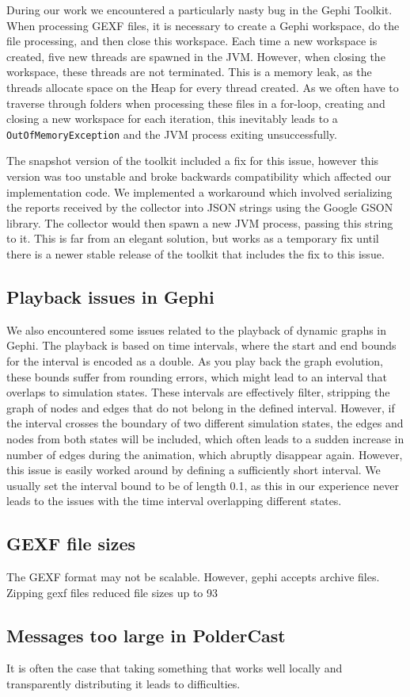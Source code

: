 During our work we encountered a particularly nasty bug in the Gephi
Toolkit. When processing GEXF files, it is necessary to create a Gephi
workspace, do the file processing, and then close this workspace. Each
time a new workspace is created, five new threads are spawned in the
JVM\@. However, when closing the workspace, these threads are not
terminated. This is a memory leak, as the threads allocate space on the
Heap for every thread created. As we often have to traverse through
folders when processing these files in a for-loop, creating and closing
a new workspace for each iteration, this inevitably leads to a
\texttt{OutOfMemoryException} and the JVM process exiting
unsuccessfully.

The snapshot version of the toolkit included a fix for this issue,
however this version was too unstable and broke backwards compatibility
which affected our implementation code. We implemented a workaround
which involved serializing the reports received by the collector into
JSON strings using the Google GSON~\cite{gson} library. The collector
would then spawn a new JVM process, passing this string to it.  This is
far from an elegant solution, but works as a temporary fix until there
is a newer stable release of the toolkit that includes the fix to this
issue.

\subsection{Playback issues in Gephi}

We also encountered some issues related to the playback of dynamic
graphs in Gephi. The playback is based on time intervals, where the
start and end bounds for the interval is encoded as a double. As you
play back the graph evolution, these bounds suffer from rounding errors,
which might lead to an interval that overlaps to simulation states.
These intervals are effectively filter, stripping the graph of nodes and
edges that do not belong in the defined interval. However, if the
interval crosses the boundary of two different simulation states, the
edges and nodes from both states will be included, which often leads to
a sudden increase in number of edges during the animation, which
abruptly disappear again. However, this issue is easily worked around by
defining a sufficiently short interval. We usually set the interval
bound to be of length 0.1, as this in our experience never leads to the
issues with the time interval overlapping different states.

\subsection{GEXF file sizes}
The GEXF format may not be scalable. However, gephi accepts
archive files. Zipping gexf files reduced file sizes up to 93%

\subsection{Messages too large in PolderCast}
It is often the case that taking something that works well
locally and transparently distributing it leads to difficulties.
